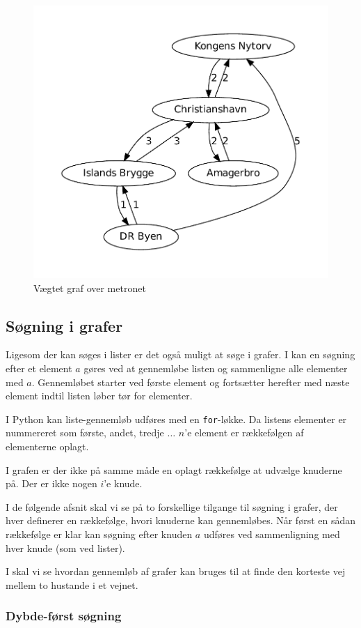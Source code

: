 \documentclass[10pt,a4paper,danish]{article}
\newcommand{\ct}{\texttt}
\begin{document}
\begin{figure}[h]\centering
\includegraphics[width=.75\textwidth]{graphs/metro2.pdf}
\caption{Vægtet graf over metronet}
\label{fig:metro2}
\end{figure}




\subsection{Søgning i grafer}
Ligesom der kan søges i lister er det også muligt at søge i grafer. I
kan en søgning efter et element $a$ gøres ved at gennemløbe listen og
sammenligne alle elementer med $a$. Gennemløbet starter ved første
element og fortsætter herefter med næste element indtil listen løber
tør for elementer.

I Python kan liste-gennemløb udføres med en \ct{for}-løkke. Da listens
elementer er nummereret som første, andet, tredje $\dots$ $n$'e
element er rækkefølgen af elementerne oplagt.

I grafen er der ikke på samme måde en oplagt rækkefølge at udvælge
knuderne på. Der er ikke nogen $i$'e knude.

I de følgende afsnit skal vi se på to forskellige tilgange til søgning
i grafer, der hver definerer en rækkefølge, hvori knuderne kan
gennemløbes. Når først en sådan rækkefølge er klar kan søgning efter
knuden $a$ udføres ved sammenligning med hver knude (som ved
lister).

I  skal vi se hvordan gennemløb af grafer kan
bruges til at finde den korteste vej mellem to hustande i et vejnet.


\subsubsection{Dybde-først søgning}
\end{document}
